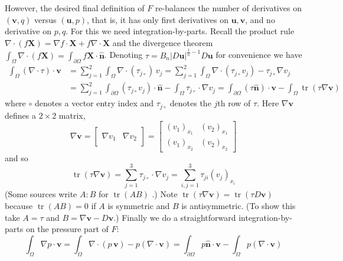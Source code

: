 \documentclass[letterpaper,final,12pt,reqno]{amsart}
\newcommand{\grad}{\nabla}
\newcommand{\trace}{\operatorname{tr}}
\newcommand{\hbn}{\hat{\mathbf{n}}}
\newcommand{\bu}{\mathbf{u}}
\newcommand{\bv}{\mathbf{v}}
\newcommand{\bX}{\mathbf{X}}
\begin{document}
However, the desired final definition of $F$ re-balances the number of derivatives on $(\bv,q)$ versus $(\bu,p)$, that is, it has only first derivatives on $\bu,\bv$, and no derivative on $p,q$.  For this we need integration-by-parts.  Recall the product rule $\nabla \cdot(f\bX) = \grad f\cdot \bX + f \nabla \cdot \bX$ and the divergence theorem $\int_\Omega \nabla \cdot (f\bX) = \int_{\partial \Omega} f\bX \cdot \hbn$.  Denoting $\tau = B_n |D\bu|^{\frac{1}{n} - 1} D\bu$ for convenience we have
\begin{align*}
\int_\Omega \left(\nabla \cdot \tau\right)\cdot \bv &= \sum_{j=1}^2 \int_\Omega \nabla \cdot (\tau_{j\circ})\, v_j = \sum_{j=1}^2 \int_\Omega \nabla \cdot (\tau_{j\circ} v_j) - \tau_{j\circ} \nabla v_j \\
  &= \sum_{j=1}^2 \int_{\partial \Omega} (\tau_{j\circ} v_j) \cdot \hbn - \int_\Omega \tau_{j\circ} \cdot \nabla v_j = \int_{\partial \Omega} (\tau \hbn)\cdot \bv - \int_\Omega \trace(\tau \nabla \bv)
\end{align*}
where $\circ$ denotes a vector entry index and $\tau_{j\circ}$ denotes the $j$th row of $\tau$.  Here $\grad\bv$ defines a $2\times 2$ matrix,
\newcommand{\treftwo}[2]{\left[\begin{array}{c|c} & \\ #1 & #2 \\ & \end{array}\right]}
\newcommand{\trefthree}[3]{\left[\begin{array}{c|c|c} & & \\ #1 & #2 & #3 \\ & & \end{array}\right]}
    $$\grad \bv = \treftwo{\grad v_1}{\grad v_2} = \begin{bmatrix}
    (v_1)_{x_1} & (v_2)_{x_1} \\
    (v_1)_{x_2} & (v_2)_{x_2}
    \end{bmatrix}$$
and so
    $$\trace(\tau \grad \bv) = \sum_{j=1}^3 \tau_{j\circ} \cdot \grad v_j = \sum_{i,j=1}^3 \tau_{ji} (v_j)_{x_i}$$
(Some sources write $A:B$ for $\trace(AB)$ \cite{JouvetRappaz2011}.)  Note $\trace(\tau \grad \bv) = \trace(\tau D\bv)$ because $\trace(AB)=0$ if $A$ is symmetric and $B$ is antisymmetric.  (To show this take $A=\tau$ and $B=\grad\bv-D\bv$.)  Finally we do a straightforward integration-by-parts on the pressure part of $F$:
    $$\int_\Omega \nabla p \cdot \bv = \int_\Omega \nabla\cdot (p\,\bv) - p (\nabla \cdot \bv) = \int_{\partial \Omega} p\hbn \cdot \bv - \int_\Omega p (\nabla \cdot \bv)$$
\end{document}
